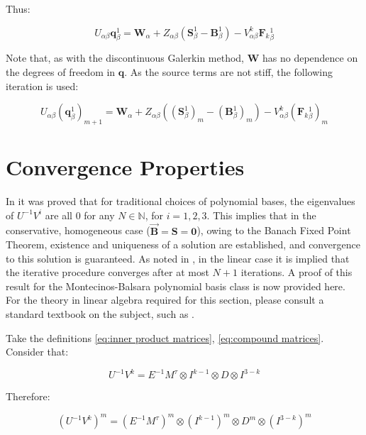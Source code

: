 \documentclass[twoside,english,final,5p,times,twocolumn]{elsarticle}
\begin{document}
Thus:

\begin{equation}
U_{\alpha\beta}\boldsymbol{q}_{\beta}^{1}=\boldsymbol{W}_{\alpha}+Z_{\alpha\beta}\left(\boldsymbol{S}_{\beta}^{1}-\boldsymbol{B}_{\beta}^{1}\right)-V_{\alpha\beta}^{k}\boldsymbol{F}_{k}{}_{\beta}^{1}
\end{equation}

Note that, as with the discontinuous Galerkin method, $\boldsymbol{W}$
has no dependence on the degrees of freedom in $\boldsymbol{q}$.
As the source terms are not stiff, the following iteration is used:

\begin{equation}
U_{\alpha\beta}\left(\boldsymbol{q}_{\beta}^{1}\right)_{m+1}=\boldsymbol{W}_{\alpha}+Z_{\alpha\beta}\left(\left(\boldsymbol{S}_{\beta}^{1}\right)_{m}-\left(\boldsymbol{B}_{\beta}^{1}\right)_{m}\right)-V_{\alpha\beta}^{k}\left(\boldsymbol{F}_{k}{}_{\beta}^{1}\right)_{m}
\end{equation}


\section{Convergence Properties}

In \citet{Jackson2017} it was proved that for traditional choices
of polynomial bases, the eigenvalues of $U^{-1}V^{i}$ are all 0 for
any $N\in\mathbb{N}$, for $i=1,2,3$. This implies that in the conservative,
homogeneous case ($\overrightarrow{\boldsymbol{B}}=\boldsymbol{S}=\boldsymbol{0}$),
owing to the Banach Fixed Point Theorem, existence and uniqueness
of a solution are established, and convergence to this solution is
guaranteed. As noted in \citet{Dumbser2009a}, in the linear case
it is implied that the iterative procedure converges after at most
$N+1$ iterations. A proof of this result for the Montecinos-Balsara
polynomial basis class is now provided here. For the theory in linear
algebra required for this section, please consult a standard textbook
on the subject, such as \citet{Nering1970}.

Take the definitions \eqref{eq:inner product matrices}, \eqref{eq:compound matrices}.
Consider that:

\begin{equation}
U^{-1}V^{k}=E^{-1}M^{\tau}\otimes I^{k-1}\otimes D\otimes I^{3-k}
\end{equation}

Therefore:

\begin{equation}
\left(U^{-1}V^{k}\right)^{m}=\left(E^{-1}M^{\tau}\right)^{m}\otimes\left(I^{k-1}\right)^{m}\otimes D^{m}\otimes\left(I^{3-k}\right)^{m}
\end{equation}
\end{document}
